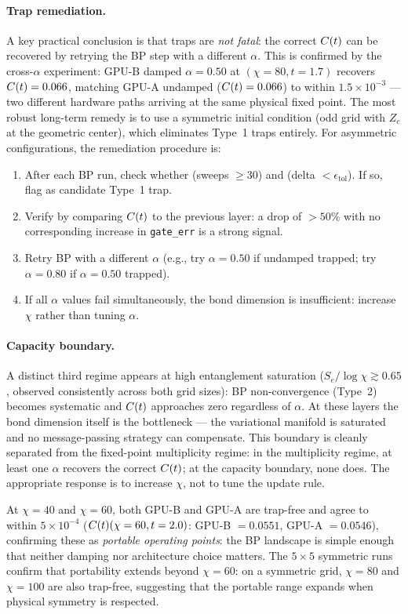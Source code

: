 \paragraph{Trap remediation.}
A key practical conclusion is that traps are \emph{not fatal}: the correct
$C(t)$ can be recovered by retrying the BP step with a different $\alpha$.
This is confirmed by the cross-$\alpha$ experiment: GPU-B damped $\alpha=0.50$
at $(\chi=80, t=1.7)$ recovers $C(t) = 0.066$, matching GPU-A undamped
($C(t) = 0.066$) to within $1.5\times10^{-3}$ --- two different hardware paths
arriving at the same physical fixed point.
The most robust long-term remedy is to use a symmetric initial condition
(odd grid with $Z_c$ at the geometric center), which eliminates Type~1 traps
entirely.
For asymmetric configurations, the remediation procedure is:
\begin{enumerate}
 \item After each BP run, check whether (sweeps $\geq 30$) and
 (delta $< \epsilon_{\mathrm{tol}}$).
 If so, flag as candidate Type~1 trap.
 \item Verify by comparing $C(t)$ to the previous layer: a drop of $>50\%$
 with no corresponding increase in \texttt{gate\_err} is a strong signal.
 \item Retry BP with a different $\alpha$ (e.g., try $\alpha=0.50$ if
 undamped trapped; try $\alpha=0.80$ if $\alpha=0.50$ trapped).
 \item If all $\alpha$ values fail simultaneously, the bond dimension is
 insufficient: increase $\chi$ rather than tuning $\alpha$.
\end{enumerate}

\paragraph{Capacity boundary.}
A distinct third regime appears at high entanglement saturation
($S_e/\log\chi \gtrsim 0.65$, observed consistently across both grid sizes):
BP non-convergence (Type~2) becomes systematic and $C(t)$ approaches zero
regardless of $\alpha$.
At these layers the bond dimension itself is the bottleneck --- the variational
manifold is saturated and no message-passing strategy can compensate.
This boundary is cleanly separated from the fixed-point multiplicity regime:
in the multiplicity regime, at least one $\alpha$ recovers the correct $C(t)$;
at the capacity boundary, none does.
The appropriate response is to increase $\chi$, not to tune the update rule.

At $\chi=40$ and $\chi=60$, both GPU-B and GPU-A are trap-free and agree to
within $5\times10^{-4}$ ($C(t)(\chi=60, t=2.0)$: GPU-B $= 0.0551$,
GPU-A $= 0.0546$), confirming these as \emph{portable operating points}: the BP
landscape is simple enough that neither damping nor architecture choice matters.
The $5\times5$ symmetric runs confirm that portability extends beyond
$\chi=60$: on a symmetric grid, $\chi=80$ and $\chi=100$ are also trap-free,
suggesting that the portable range expands when physical symmetry is respected.

